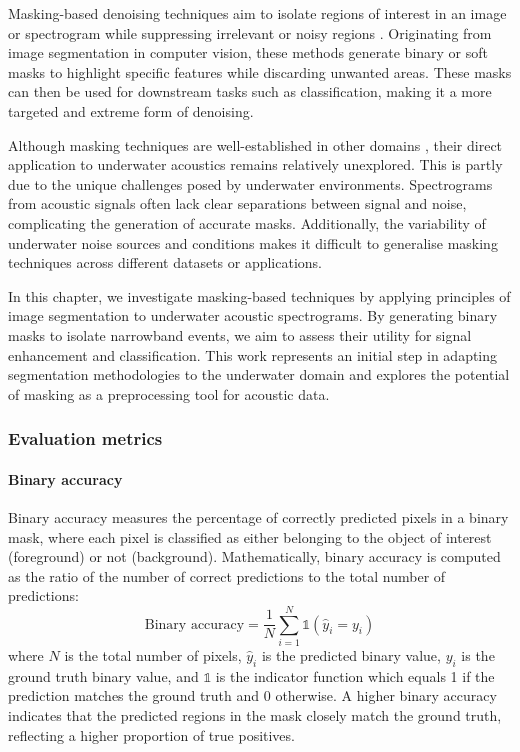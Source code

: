 Masking-based denoising techniques aim to isolate regions of interest in an image or spectrogram while suppressing irrelevant or noisy regions \cite{zhou_self-noise_2023, alamdari_improving_2020}. Originating from image segmentation in computer vision, these methods generate binary or soft masks to highlight specific features while discarding unwanted areas. These masks can then be used for downstream tasks such as classification, making it a more targeted and extreme form of denoising. 

Although masking techniques are well-established in other domains \cite{liu_using_2018}, their direct application to underwater acoustics remains relatively unexplored. This is partly due to the unique challenges posed by underwater environments. Spectrograms from acoustic signals often lack clear separations between signal and noise, complicating the generation of accurate masks. Additionally, the variability of underwater noise sources and conditions makes it difficult to generalise masking techniques across different datasets or applications.

In this chapter, we investigate masking-based techniques by applying principles of image segmentation to underwater acoustic spectrograms. By generating binary masks to isolate narrowband events, we aim to assess their utility for signal enhancement and classification. This work represents an initial step in adapting segmentation methodologies to the underwater domain and explores the potential of masking as a preprocessing tool for acoustic data.

\subsubsection{Evaluation metrics}

\paragraph{Binary accuracy}
Binary accuracy measures the percentage of correctly predicted pixels in a binary mask, where each pixel is classified as either belonging to the object of interest (foreground) or not (background). Mathematically, binary accuracy is computed as the ratio of the number of correct predictions to the total number of predictions: 
\begin{equation} 
\text{Binary accuracy} = \frac{1}{N} \sum_{i=1}^{N} \mathds{1}(\hat{y}_i = y_i) 
\end{equation}
where $N$ is the total number of pixels, $\hat{y}_i$ is the predicted binary value, $y_i$ is the ground truth binary value, and $\mathds{1}$ is the indicator function which equals 1 if the prediction matches the ground truth and 0 otherwise. A higher binary accuracy indicates that the predicted regions in the mask closely match the ground truth, reflecting a higher proportion of true positives.

